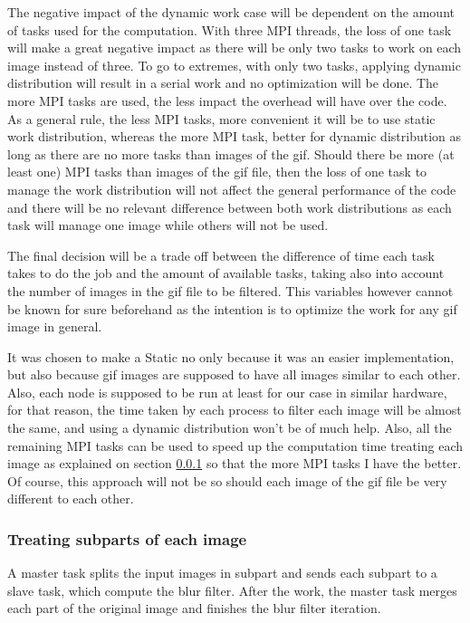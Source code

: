 \documentclass[conference,compsoc]{IEEEtran}
\begin{document}
The negative impact of the dynamic work case will be dependent on the amount of tasks used for the computation. With three MPI threads, the loss of one task will make a great negative impact as there will be only two tasks to work on each image instead of three. To go to extremes, with only two tasks, applying dynamic distribution will result in a serial work and no optimization will be done. The more MPI tasks are used, the less impact the overhead will have over the code. As a general rule, the less MPI tasks, more convenient it will be to use static work distribution, whereas the more MPI task, better for dynamic distribution as long as there are no more tasks than images of the gif. Should there be more (at least one) MPI tasks than images of the gif file, then the loss of one task to manage the work distribution will not affect the general performance of the code and there will be no relevant difference between both work distributions as each task will manage one image while others will not be used.

The final decision will be a trade off between the difference of time each task takes to do the job and the amount of available tasks, taking also into account the number of images in the gif file to be filtered. This variables however cannot be known for sure beforehand as the intention is to optimize the work for any gif image in general.

It was chosen to make a Static no only because it was an easier implementation, but also because gif images are supposed to have all images similar to each other. Also, each node is supposed to be run at least for our case in similar hardware, for that reason, the time taken by each process to filter each image will be almost the same, and using a dynamic distribution won't be of much help. 
Also, all the remaining MPI tasks can be used to speed up the computation time treating each image as explained on section \ref{sec:treating_subparts} so that the more MPI tasks I have the better.
Of course, this approach will not be so should each image of the gif file be very different to each other.

\subsubsection{Treating subparts of each image} \label{sec:treating_subparts}
A master task splits the input images in subpart and sends each subpart to a slave task, which compute the blur filter.
After the work, the master task merges each part of the original image and finishes the blur filter iteration.
\end{document}
